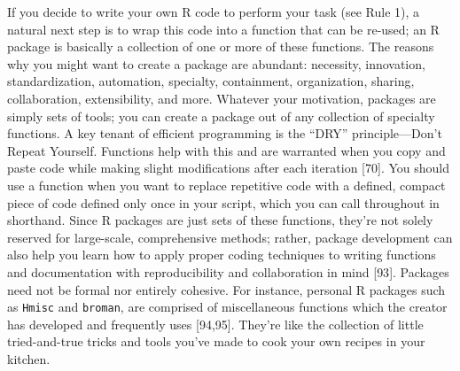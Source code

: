 \documentclass[10pt,letterpaper]{article}
\begin{document}
If you decide to write your own R code to perform your task (see Rule
1), a natural next step is to wrap this code into a function that can be
re-used; an R package is basically a collection of one or more of these
functions. The reasons why you might want to create a package are
abundant: necessity, innovation, standardization, automation, specialty,
containment, organization, sharing, collaboration, extensibility, and
more. Whatever your motivation, packages are simply sets of tools; you
can create a package out of any collection of specialty functions. A key
tenant of efficient programming is the ``DRY'' principle---Don't Repeat
Yourself. Functions help with this and are warranted when you copy and
paste code while making slight modifications after each iteration
{[}70{]}. You should use a function when you want to replace repetitive
code with a defined, compact piece of code defined only once in your
script, which you can call throughout in shorthand. Since R packages are
just sets of these functions, they're not solely reserved for
large-scale, comprehensive methods; rather, package development can also
help you learn how to apply proper coding techniques to writing
functions and documentation with reproducibility and collaboration in
mind {[}93{]}. Packages need not be formal nor entirely cohesive. For
instance, personal R packages such as \texttt{Hmisc} and
\texttt{broman}, are comprised of miscellaneous functions which the
creator has developed and frequently uses {[}94,95{]}. They're like the
collection of little tried-and-true tricks and tools you've made to cook
your own recipes in your kitchen.
\end{document}
